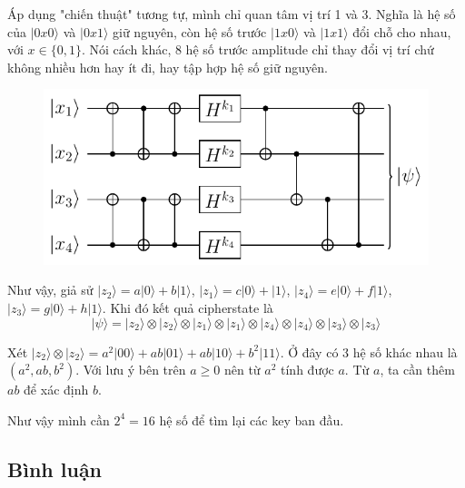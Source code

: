 Áp dụng "chiến thuật" tương tự, mình chỉ quan tâm vị trí 1 và 3. Nghĩa là hệ số của $\lvert 0 x 0 \rangle$ và $\lvert 0 x 1 \rangle$ giữ nguyên, còn hệ số trước $\lvert 1 x 0 \rangle$ và $\lvert 1 x 1 \rangle$ đổi chỗ cho nhau, với $x \in \{ 0, 1 \}$. Nói cách khác, 8 hệ số trước amplitude chỉ thay đổi vị trí chứ không nhiều hơn hay ít đi, hay tập hợp hệ số giữ nguyên.

\begin{figure}[ht]
    \centering
    \includegraphics[page=8]{nsucrypto/2023/problem10_figures.pdf}
\end{figure}

Như vậy, giả sử $\lvert z_2 \rangle = a \lvert 0 \rangle + b \lvert 1 \rangle$, $\lvert z_1 \rangle = c \lvert 0 \rangle + \lvert 1 \rangle$, $\lvert z_4 \rangle = e \lvert 0 \rangle + f \lvert 1 \rangle$, $\lvert z_3 \rangle = g \lvert 0 \rangle + h \lvert 1 \rangle$. Khi đó kết quả cipherstate là
\begin{equation*}
    \lvert \psi \rangle = \lvert z_2 \rangle \otimes \lvert z_2 \rangle \otimes \lvert z_1 \rangle \otimes \lvert z_1 \rangle \otimes \lvert z_4 \rangle \otimes \lvert z_4 \rangle \otimes \lvert z_3 \rangle \otimes \lvert z_3 \rangle
\end{equation*}

Xét $\lvert z_2 \rangle \otimes \lvert z_2 \rangle = a^2 \lvert 00 \rangle + ab \lvert 01 \rangle + ab \lvert 10 \rangle + b^2 \lvert 11 \rangle$. Ở đây có 3 hệ số khác nhau là $(a^2, ab, b^2)$. Với lưu ý bên trên $a \geqslant 0$ nên từ $a^2$ tính được $a$. Từ $a$, ta cần thêm $ab$ để xác định $b$.

Như vậy mình cần $2^4 = 16$ hệ số để tìm lại các key ban đầu.

\subsection*{Bình luận}

